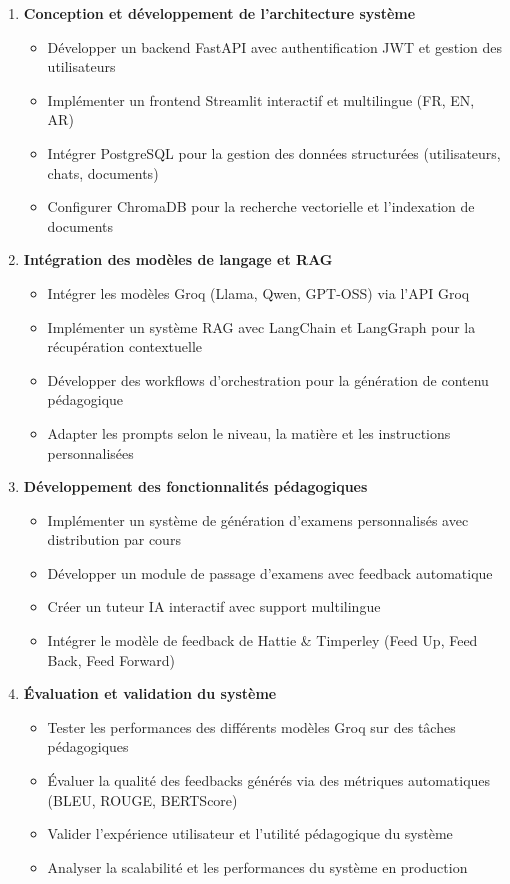 \begin{enumerate}
    \item \textbf{Conception et développement de l'architecture système}
    \begin{itemize}
        \item Développer un backend FastAPI avec authentification JWT et gestion des utilisateurs
        \item Implémenter un frontend Streamlit interactif et multilingue (FR, EN, AR)
        \item Intégrer PostgreSQL pour la gestion des données structurées (utilisateurs, chats, documents)
        \item Configurer ChromaDB pour la recherche vectorielle et l'indexation de documents
    \end{itemize}
    
    \item \textbf{Intégration des modèles de langage et RAG}
    \begin{itemize}
        \item Intégrer les modèles Groq (Llama, Qwen, GPT-OSS) via l'API Groq
        \item Implémenter un système RAG avec LangChain et LangGraph pour la récupération contextuelle
        \item Développer des workflows d'orchestration pour la génération de contenu pédagogique
        \item Adapter les prompts selon le niveau, la matière et les instructions personnalisées
    \end{itemize}
    
    \item \textbf{Développement des fonctionnalités pédagogiques}
    \begin{itemize}
        \item Implémenter un système de génération d'examens personnalisés avec distribution par cours
        \item Développer un module de passage d'examens avec feedback automatique
        \item Créer un tuteur IA interactif avec support multilingue
        \item Intégrer le modèle de feedback de Hattie \& Timperley (Feed Up, Feed Back, Feed Forward)
    \end{itemize}
    
    \item \textbf{Évaluation et validation du système}
    \begin{itemize}
        \item Tester les performances des différents modèles Groq sur des tâches pédagogiques
        \item Évaluer la qualité des feedbacks générés via des métriques automatiques (BLEU, ROUGE, BERTScore)
        \item Valider l'expérience utilisateur et l'utilité pédagogique du système
        \item Analyser la scalabilité et les performances du système en production
    \end{itemize}
\end{enumerate}

